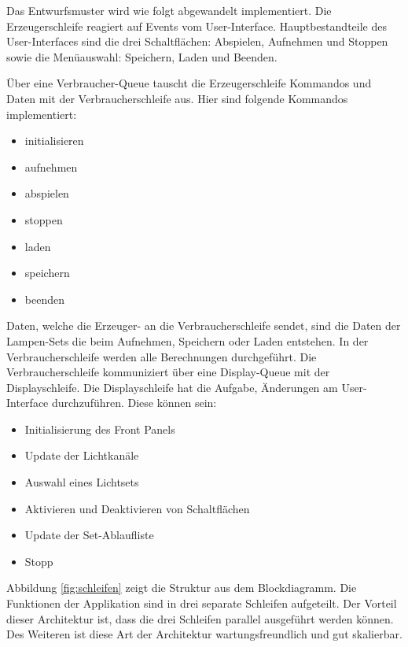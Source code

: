 Das Entwurfsmuster wird wie folgt abgewandelt implementiert.  Die Erzeugerschleife reagiert auf Events vom User-Interface. 
Hauptbestandteile des User-Interfaces  sind die drei Schaltflächen: Abspielen, Aufnehmen und Stoppen sowie die Menüauswahl: Speichern, Laden und Beenden.

Über eine Verbraucher-Queue tauscht die Erzeugerschleife Kommandos und Daten mit der Verbraucherschleife aus. Hier sind folgende Kommandos implementiert:
\begin{itemize}
\item initialisieren
\item aufnehmen
\item abspielen
\item stoppen
\item laden
\item speichern 
\item beenden
\end{itemize}
Daten, welche die Erzeuger- an die Verbraucherschleife sendet, sind die Daten der Lampen-Sets die beim Aufnehmen, Speichern oder Laden entstehen. 
In der Verbraucherschleife werden alle Berechnungen durchgeführt. Die Verbraucherschleife kommuniziert über eine Display-Queue mit der Displayschleife.
Die Displayschleife hat die Aufgabe, Änderungen am User-Interface durchzuführen. Diese können sein:
\begin{itemize}
\item Initialisierung des Front Panels
\item Update der Lichtkanäle
\item Auswahl eines Lichtsets
\item Aktivieren und Deaktivieren von Schaltflächen
\item Update der Set-Ablaufliste
\item Stopp
\end{itemize}

Abbildung \ref{fig:schleifen} zeigt die Struktur aus dem Blockdiagramm. 
Die Funktionen der Applikation sind in drei separate Schleifen aufgeteilt. Der Vorteil dieser Architektur ist, 
dass die drei Schleifen parallel ausgeführt werden können. 
Des Weiteren ist diese Art der Architektur wartungsfreundlich und gut skalierbar. 


